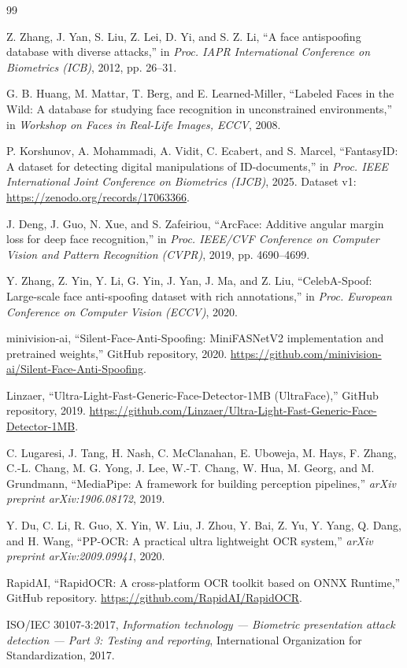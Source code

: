 \documentclass[12pt,a4paper]{article}
\begin{document}
\newpage
\renewcommand{\refname}{Tài liệu tham khảo}
\begin{thebibliography}{99}
\sloppy

Z. Zhang, J. Yan, S. Liu, Z. Lei, D. Yi, and S. Z. Li,
``A face antispoofing database with diverse attacks,''
in \emph{Proc. IAPR International Conference on Biometrics (ICB)}, 2012, pp. 26--31.

G. B. Huang, M. Mattar, T. Berg, and E. Learned-Miller,
``Labeled Faces in the Wild: A database for studying face recognition in unconstrained environments,''
in \emph{Workshop on Faces in Real-Life Images, ECCV}, 2008.

P. Korshunov, A. Mohammadi, A. Vidit, C. Ecabert, and S. Marcel,
``FantasyID: A dataset for detecting digital manipulations of ID-documents,''
in \emph{Proc. IEEE International Joint Conference on Biometrics (IJCB)}, 2025.
Dataset v1: \url{https://zenodo.org/records/17063366}.

J. Deng, J. Guo, N. Xue, and S. Zafeiriou,
``ArcFace: Additive angular margin loss for deep face recognition,''
in \emph{Proc. IEEE/CVF Conference on Computer Vision and Pattern Recognition (CVPR)}, 2019, pp. 4690--4699.

Y. Zhang, Z. Yin, Y. Li, G. Yin, J. Yan, J. Ma, and Z. Liu,
``CelebA-Spoof: Large-scale face anti-spoofing dataset with rich annotations,''
in \emph{Proc. European Conference on Computer Vision (ECCV)}, 2020.

minivision-ai,
``Silent-Face-Anti-Spoofing: MiniFASNetV2 implementation and pretrained weights,''
GitHub repository, 2020.
\url{https://github.com/minivision-ai/Silent-Face-Anti-Spoofing}.

Linzaer,
``Ultra-Light-Fast-Generic-Face-Detector-1MB (UltraFace),''
GitHub repository, 2019.
\url{https://github.com/Linzaer/Ultra-Light-Fast-Generic-Face-Detector-1MB}.

C. Lugaresi, J. Tang, H. Nash, C. McClanahan, E. Uboweja, M. Hays, F. Zhang, C.-L. Chang, M. G. Yong,
J. Lee, W.-T. Chang, W. Hua, M. Georg, and M. Grundmann,
``MediaPipe: A framework for building perception pipelines,''
\emph{arXiv preprint arXiv:1906.08172}, 2019.

Y. Du, C. Li, R. Guo, X. Yin, W. Liu, J. Zhou, Y. Bai, Z. Yu, Y. Yang, Q. Dang, and H. Wang,
``PP-OCR: A practical ultra lightweight OCR system,''
\emph{arXiv preprint arXiv:2009.09941}, 2020.

RapidAI,
``RapidOCR: A cross-platform OCR toolkit based on ONNX Runtime,''
GitHub repository.
\url{https://github.com/RapidAI/RapidOCR}.

ISO/IEC 30107-3:2017,
\emph{Information technology --- Biometric presentation attack detection --- Part 3: Testing and reporting},
International Organization for Standardization, 2017.

\end{thebibliography}
\end{document}
